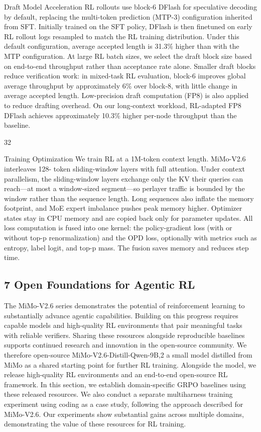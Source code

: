 \documentclass[
  10
]{article}
\begin{document}
Draft Model Acceleration RL rollouts use block-6 DFlash for speculative
decoding by default, replacing the multi-token prediction (MTP-3)
configuration inherited from SFT. Initially trained on the SFT policy,
DFlash is then finetuned on early RL rollout logs resampled to match the
RL training distribution. Under this default configuration, average
accepted length is 31.3\% higher than with the MTP configuration. At
large RL batch sizes, we select the draft block size based on end-to-end
throughput rather than acceptance rate alone. Smaller draft blocks
reduce verification work: in mixed-task RL evaluation, block-6 improves
global average throughput by approximately 6\% over block-8, with little
change in average accepted length. Low-precision draft computation (FP8)
is also applied to reduce drafting overhead. On our long-context
workload, RL-adapted FP8 DFlash achieves approximately 10.3\% higher
per-node throughput than the baseline.

32

Training Optimization We train RL at a 1M-token context length.
MiMo-V2.6 interleaves 128- token sliding-window layers with full
attention. Under context parallelism, the sliding-window layers exchange
only the KV their queries can reach---at most a window-sized
segment---so perlayer traffic is bounded by the window rather than the
sequence length. Long sequences also inflate the memory footprint, and
MoE expert imbalance pushes peak memory higher. Optimizer states stay in
CPU memory and are copied back only for parameter updates. All loss
computation is fused into one kernel: the policy-gradient loss (with or
without top-p renormalization) and the OPD loss, optionally with metrics
such as entropy, label logit, and top-p mass. The fusion saves memory
and reduces step time.

\subsection{7 Open Foundations for Agentic
RL}\label{open-foundations-for-agentic-rl}

The MiMo-V2.6 series demonstrates the potential of reinforcement
learning to substantially advance agentic capabilities. Building on this
progress requires capable models and high-quality RL environments that
pair meaningful tasks with reliable verifiers. Sharing these resources
alongside reproducible baselines supports continued research and
innovation in the open-source community. We therefore open-source
MiMo-V2.6-Distill-Qwen-9B,2 a small model distilled from MiMo as a
shared starting point for further RL training. Alongside the model, we
release high-quality RL environments and an end-to-end open-source RL
framework. In this section, we establish domain-specific GRPO baselines
using these released resources. We also conduct a separate multiharness
training experiment using coding as a case study, following the approach
described for MiMo-V2.6. Our experiments show substantial gains across
multiple domains, demonstrating the value of these resources for RL
training.
\end{document}
